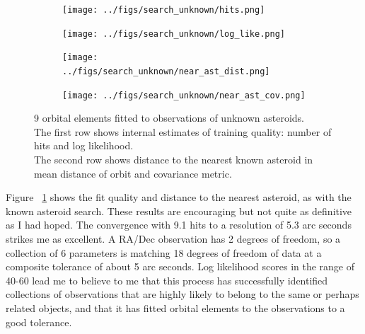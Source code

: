 

\begin{figure}[h]
\begin{subfigure}[t]{\subfigwidth\textwidth}
\centering
\texttt{[image: ../figs/search\_unknown/hits.png]}
\end{subfigure}
\hfill
\begin{subfigure}[t]{\subfigwidth\textwidth}
\centering
\texttt{[image: ../figs/search\_unknown/log\_like.png]}
\end{subfigure}
\medskip
\begin{subfigure}[t]{\subfigwidth\textwidth}
\centering
\texttt{[image: ../figs/search\_unknown/near\_ast\_dist.png]}
\end{subfigure}
\hfill
\begin{subfigure}[t]{\subfigwidth\textwidth}
\centering
\texttt{[image: ../figs/search\_unknown/near\_ast\_cov.png]}
\end{subfigure}
\caption{9 orbital elements fitted to observations of unknown asteroids.\\
The first row shows internal estimates of training quality: number of hits and log likelihood.\\
The second row shows distance to the nearest known asteroid in mean distance of orbit and covariance metric.}
\label{fig:TrainUnknown}
\end{figure}

Figure ~\ref{fig:TrainUnknown} shows the fit quality and distance to the nearest asteroid, as with the known asteroid search.
These results are encouraging but not quite as definitive as I had hoped.
The convergence with 9.1 hits to a resolution of 5.3 arc seconds strikes me as excellent.
A RA/Dec observation has 2 degrees of freedom, so a collection of 6 parameters
is matching 18 degrees of freedom of data at a composite tolerance of about 5 arc seconds.
Log likelihood scores in the range of 40-60 lead me to believe to me that this process 
has successfully identified collections of observations that are highly likely to belong to the same or perhaps related objects,
and that it has fitted orbital elements to the observations to a good tolerance.

